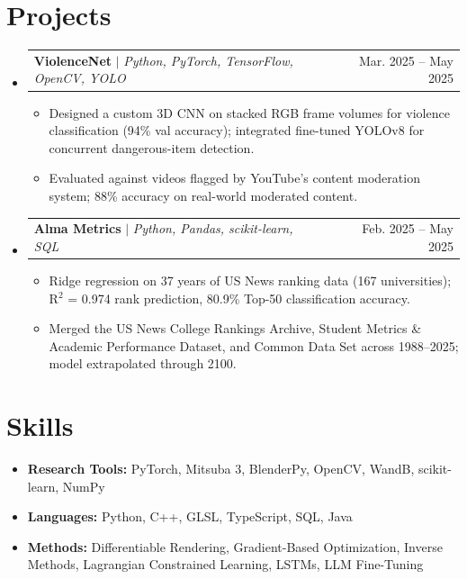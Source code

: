 \documentclass[letterpaper,11pt]{article}
\makeatletter
\newcommand{\resumeItem}[1]{
  \item\small{
    {#1 \vspace{-4pt}}
  }
}
\newcommand{\resumeProjectHeading}[2]{
    \item
    \begin{tabular*}{0.97\textwidth}{l@{\extracolsep{\fill}}r}
      \small#1 & #2 \\
    \end{tabular*}\vspace{-7pt}
}
\newcommand{\resumeSubHeadingListStart}{\begin{itemize}[leftmargin=0.15in, label={}]}
\newcommand{\resumeSubHeadingListEnd}{\end{itemize}}
\newcommand{\resumeItemListStart}{\begin{itemize}}
\newcommand{\resumeItemListEnd}{\end{itemize}\vspace{-5pt}}
\makeatother
\begin{document}
\section{Projects}
\resumeSubHeadingListStart

  \resumeProjectHeading
    {\textbf{ViolenceNet} $|$ \emph{Python, PyTorch, TensorFlow, OpenCV, YOLO}}{Mar. 2025 -- May 2025}
    \resumeItemListStart
      \resumeItem{Designed a custom 3D CNN on stacked RGB frame volumes for violence classification (94\% val accuracy); integrated fine-tuned YOLOv8 for concurrent dangerous-item detection.}
      \resumeItem{Evaluated against videos flagged by YouTube's content moderation system; 88\% accuracy on real-world moderated content.}
    \resumeItemListEnd

  \resumeProjectHeading
    {\textbf{Alma Metrics} $|$ \emph{Python, Pandas, scikit-learn, SQL}}{Feb. 2025 -- May 2025}
    \resumeItemListStart
      \resumeItem{Ridge regression on 37 years of US News ranking data (167 universities); R$^2$ = 0.974 rank prediction, 80.9\% Top-50 classification accuracy.}
      \resumeItem{Merged the US News College Rankings Archive, Student Metrics \& Academic Performance Dataset, and Common Data Set across 1988--2025; model extrapolated through 2100.}
    \resumeItemListEnd

\resumeSubHeadingListEnd

\section{Skills}
  \resumeSubHeadingListStart
    \resumeItem{\textbf{Research Tools:} PyTorch, Mitsuba 3, BlenderPy, OpenCV, WandB, scikit-learn, NumPy} \vspace{-1mm}
    \resumeItem{\textbf{Languages:} Python, C++, GLSL, TypeScript, SQL, Java} \vspace{-1mm}
    \resumeItem{\textbf{Methods:} Differentiable Rendering, Gradient-Based Optimization, Inverse Methods, Lagrangian Constrained Learning, LSTMs, LLM Fine-Tuning} \vspace{-1mm}
  \resumeSubHeadingListEnd
\end{document}
